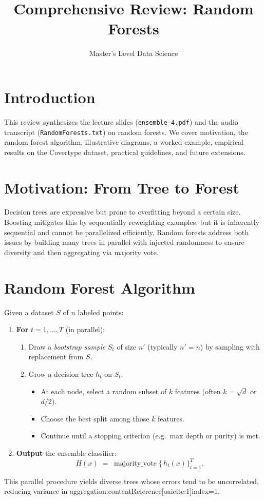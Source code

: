 \documentclass[11pt]{article}
\title{Comprehensive Review: Random Forests}
\author{Master's Level Data Science}
\date{}
\begin{document}
\maketitle
\tableofcontents
\bigskip

\section{Introduction}
This review synthesizes the lecture slides (\texttt{ensemble-4.pdf}) and the audio transcript (\texttt{RandomForests.txt}) on random forests. We cover motivation, the random forest algorithm, illustrative diagrams, a worked example, empirical results on the Covertype dataset, practical guidelines, and future extensions.

\section{Motivation: From Tree to Forest}
Decision trees are expressive but prone to overfitting beyond a certain size. Boosting mitigates this by sequentially reweighting examples, but it is inherently sequential and cannot be parallelized efficiently. Random forests address both issues by building many trees in parallel with injected randomness to ensure diversity and then aggregating via majority vote.

\section{Random Forest Algorithm}
Given a dataset $S$ of $n$ labeled points:
\begin{enumerate}
  \item \textbf{For} $t=1,\dots,T$ (in parallel):
    \begin{enumerate}
      \item Draw a \emph{bootstrap sample} $S_t$ of size $n'$ (typically $n'=n$) by sampling with replacement from $S$.
      \item Grow a decision tree $h_t$ on $S_t$:
        \begin{itemize}
          \item At each node, select a random subset of $k$ features (often $k=\sqrt{d}$ or $d/2$).
          \item Choose the best split among those $k$ features.
          \item Continue until a stopping criterion (e.g.\ max depth or purity) is met.
        \end{itemize}
    \end{enumerate}
  \item \textbf{Output} the ensemble classifier:
  \[
    H(x) \;=\;\mathop{\mathrm{majority\_vote}}\{\,h_t(x)\}_{t=1}^T.
  \]
\end{enumerate}
This parallel procedure yields diverse trees whose errors tend to be uncorrelated, reducing variance in aggregation:contentReference[oaicite:1]{index=1}.
\end{document}
